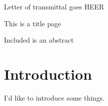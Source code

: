 \documentclass[11pt]{article}
\begin{document}
\setlength{\parindent}{2em}

\begin{titlepage}
\clearpage
\thispagestyle{empty}

Letter of transmittal goes HEER

\end{titlepage}

\begin{titlepage}
\clearpage
\thispagestyle{empty}

This is a title page

Included is an abstract
\end{titlepage}

\tableofcontents
\newpage


\section{Introduction}
I'd like to introduce some things.
\end{document}
